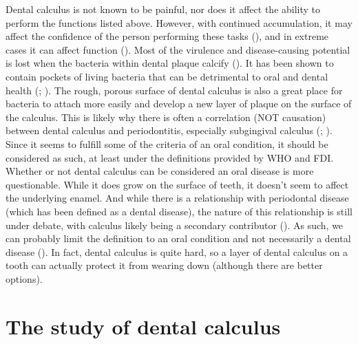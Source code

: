 \documentclass[
  b5paper,
]{book}
\begin{document}
Dental calculus is not known to be painful, nor does it affect the
ability to perform the functions listed above. However, with continued
accumulation, it may affect the confidence of the person performing
these tasks (), and in extreme cases it can affect function
().
Most of the virulence and disease-causing potential is lost when the
bacteria within dental plaque calcify
(). It has
been shown to contain pockets of living bacteria that can be detrimental
to oral and dental health
(; ). The rough, porous surface of dental calculus is also a great
place for bacteria to attach more easily and develop a new layer of
plaque on the surface of the calculus. This is likely why there is often
a correlation (NOT causation) between dental calculus and periodontitis,
especially subgingival calculus
(;
). Since it
seems to fulfill some of the criteria of an oral condition, it should be
considered as such, at least under the definitions provided by WHO and
FDI. Whether or not dental calculus can be considered an oral disease is
more questionable. While it does grow on the surface of teeth, it
doesn't seem to affect the underlying enamel. And while there is a
relationship with periodontal disease (which has been defined as a
dental disease), the nature of this relationship is still under debate,
with calculus likely being a secondary contributor
(). As
such, we can probably limit the definition to an oral condition and not
necessarily a dental disease
(). In fact, dental calculus is quite hard, so a layer of dental
calculus on a tooth can actually protect it from wearing down (although
there are better options).

\section{The study of dental calculus}\label{intro-study}
\end{document}
